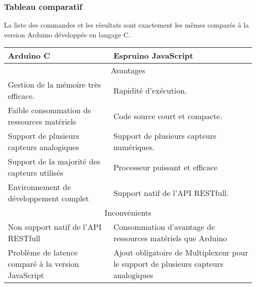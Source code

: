 \newpage
\subsubsection{Tableau comparatif}
La liste des commandes et les résultats sont exactement les mêmes comparés à la version Arduino développée en langage C.

\begin{center}
\centering
\begin{tabular}{|p{7cm}|p{7cm}|}
\hline
Arduino C & Espruino JavaScript \\
\hline
\multicolumn{2}{|c|}{Avantages}\\
\hline
\hline
Gestion de la mémoire très efficace. & Rapidité d’exécution.\\
\hline
\hline
Faible consommation de ressources matériels & Code source court et compacte.\\
\hline
\hline
Support de plusieurs capteurs analogiques & Support de plusieurs capteurs numériques.\\
\hline
\hline
Support de la majorité des capteurs utilisés  & Processeur puissant et efficace \\
\hline
\hline
Environnement de développement complet  & Support natif de l'API RESTfull.   \\
\hline
\hline
\multicolumn{2}{|c|}{Inconvénients}\\
\hline
\hline
Non support natif de l'API RESTfull  & Consommation d'avantage de ressources matériels que Arduino\\
\hline
\hline
Problème de latence comparé à la version JavaScript  & Ajout obligatoire de Multiplexeur pour le support de plusieurs capteurs analogiques\\
\hline
\end{tabular}
\end{center}